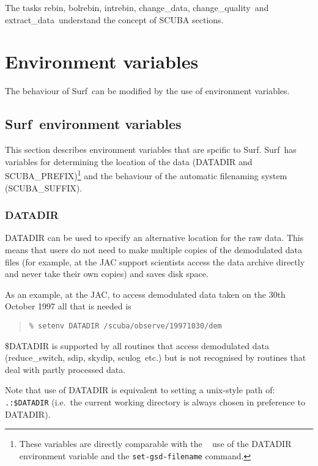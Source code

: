 \documentclass[twoside,11pt]{article}
\newcommand{\scusoft}          {{\sc Surf}}
\newcommand{\specx}{\xref{{\sc{Specx}}}{sc8}{}}
\newcommand{\task}[1]{{\sf #1}}
\newcommand{\rebin}{\htmlref{\task{rebin}}{REBIN}}
\newcommand{\bolrebin}{\htmlref{\task{bolrebin}}{BOLREBIN}}
\newcommand{\intrebin}{\htmlref{\task{intrebin}}{INTREBIN}}
\newcommand{\chgqual}{\htmlref{\task{change\_quality}}{CHANGE_QUALITY}}
\newcommand{\chgdata}{\htmlref{\task{change\_data}}{CHANGE_DATA}}
\newcommand{\resw}{\htmlref{\task{reduce\_switch}}{REDUCE_SWITCH}}
\newcommand{\skydip}{\htmlref{\task{skydip}}{SKYDIP}}
\newcommand{\extdata}{\htmlref{\task{extract\_data}}{EXTRACT_DATA}}
\newcommand{\sculog}{\htmlref{\task{sculog}}{SCULOG}}
\newcommand{\sdip}{\htmlref{\task{sdip}}{SDIP}}
\newenvironment{myquote}{\begin{quote}\begin{small}}{\end{small}\end{quote}}
\newcommand{\htmlref}[2]{#1}
\newcommand{\xref}[3]{#1}
\newcommand{\xlabel}[1]{}
\begin{document}
The tasks \rebin, \bolrebin, \intrebin, \chgdata, \chgqual\ and
\extdata\ understand the concept of SCUBA sections.


\section{\xlabel{env}Environment variables\label{env}}

The behaviour of \scusoft\ can be modified by the use of environment
variables. 

\subsection{\scusoft\ environment variables}

This section describes environment variables that are spcific to \scusoft.
\scusoft\ has variables for determining the location of the data (DATADIR and
SCUBA\_PREFIX)\footnote{These variables are directly comparable with the
\specx\ \cite{specx} use of the DATADIR environment variable and the
\texttt{set-gsd-filename} command.} and the behaviour of the automatic
filenaming system (SCUBA\_SUFFIX). 

\subsubsection{DATADIR}

DATADIR can be used to specify an alternative location for the raw data.
This means that users do not need to make multiple copies of the demodulated
data files (for example, at the JAC support scientists access the data archive 
directly and never take their own copies) and saves disk space.

As an example, at the JAC, to access demodulated data taken on the 30th
October 1997 all that is needed is
\begin{myquote}
\begin{verbatim}
% setenv DATADIR /scuba/observe/19971030/dem
\end{verbatim}
\end{myquote}
\$DATADIR is supported by all routines that access demodulated data
(\resw, \sdip, \skydip, \sculog\ etc.) but is not recognised by routines that
deal with partly processed data.

Note that use of DATADIR is equivalent to setting a unix-style path of:
\verb+.:$DATADIR+ (i.e.\ the current working directory is always chosen in
preference to DATADIR).


\end{document}
